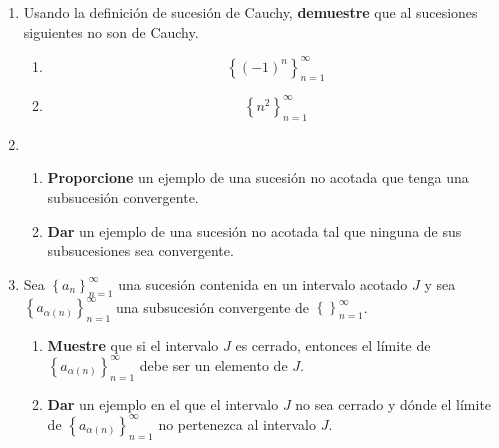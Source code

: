 \documentclass[12pt]{article}
\begin{document}
\begin{enumerate}
\begin{multicols}{3}
\begin{enumerate}
            \item \begin{equation*}
                \left\{\frac{1}{2^n}\right\}_{n=1}^{\infty}
            \end{equation*}
            \item \begin{equation*}
                \left\{1-\frac{2}{\sqrt{n}}\right\}_{n=1}^{\infty}
            \end{equation*}
        \end{enumerate}
    \end{multicols}
    \item Usando la definición de sucesión de Cauchy, \textbf{demuestre} que al sucesiones siguientes no son de Cauchy.
    \begin{multicols}{2}
        \begin{enumerate}
            \item \begin{equation*}
                \left\{(-1)^n\right\}_{n=1}^{\infty}
            \end{equation*}
            \item \begin{equation*}
                \left\{n^2\right\}_{n=1}^{\infty}
            \end{equation*}
        \end{enumerate}
    \end{multicols}
    \item \begin{enumerate}
        \item \textbf{Proporcione} un ejemplo de una sucesión no acotada que tenga una subsucesión convergente.
        \item \textbf{Dar} un ejemplo de una sucesión no acotada tal que ninguna de sus subsucesiones sea convergente.
    \end{enumerate}
    \item Sea $\left\{a_n\right\}_{n=1}^{\infty}$ una sucesión contenida en un intervalo acotado $J$ y sea $\left\{a_{\alpha(n)}\right\}_{n=1}^{\infty}$ una subsucesión convergente de $\left\{\right\}_{n=1}^{\infty}$.
    \begin{enumerate}
        \item \textbf{Muestre} que si el intervalo $J$ es cerrado, entonces el límite de $\left\{a_{\alpha(n)}\right\}_{n=1}^{\infty}$ debe ser un elemento de $J$.
        \item \textbf{Dar} un ejemplo en el que el intervalo $J$ no sea cerrado y dónde el límite de $\left\{a_{\alpha(n)}\right\}_{n=1}^{\infty}$ no pertenezca al intervalo $J$.

\end{enumerate}
\end{enumerate}
\end{document}
